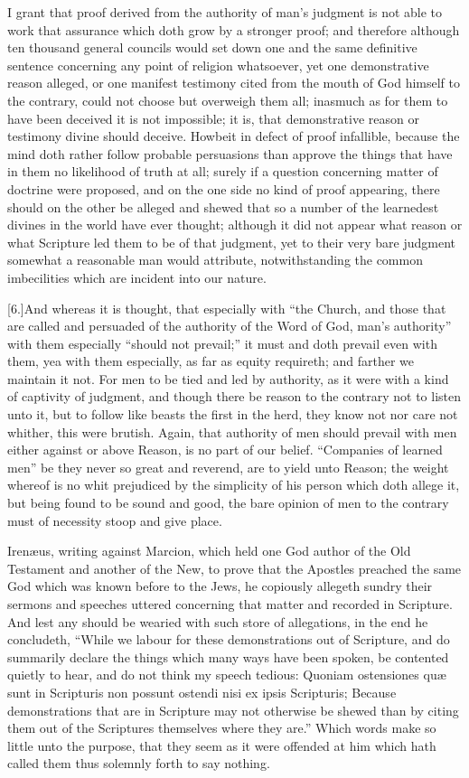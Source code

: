 I grant that proof derived from the authority of man’s judgment is not able to work that assurance which doth grow by a stronger proof; and therefore although ten thousand general councils would set down one and the same definitive sentence concerning any point of religion whatsoever, yet one demonstrative reason alleged, or one manifest testimony cited from the mouth of God himself to the contrary, could not  choose but overweigh them all; inasmuch as for them to have been deceived it is not impossible; it is, that demonstrative reason or testimony divine should deceive. Howbeit in defect of proof infallible, because the mind doth rather follow probable persuasions than approve the things that have in them no likelihood of truth at all; surely if a question concerning matter of doctrine were proposed, and on the one side no kind of proof appearing, there should on the other be alleged and shewed that so a number of the learnedest divines in the world have ever thought; although it did not appear what reason or what Scripture led them to be of that judgment, yet to their very bare judgment somewhat a reasonable man would attribute, notwithstanding the common imbecilities which are incident into our nature.

[6.]And whereas it is thought, that especially with “the Church, and those that are called and persuaded of the authority of the Word of God, man’s authority” with them especially “should not prevail;” it must and doth prevail even with them, yea with them especially, as far as equity requireth; and farther we maintain it not. For men to be  tied and led by authority, as it were with a kind of captivity of judgment, and though there be reason to the contrary not to listen unto it, but to follow like beasts the first in the herd, they know not nor care not whither, this were brutish. Again, that authority of men should prevail with men either against or above Reason, is no part of our belief. “Companies of learned men” be they never so great and reverend, are to yield unto Reason; the weight whereof is no whit prejudiced by the simplicity of his person which doth allege it, but being found to be sound and good, the bare opinion of men to the contrary must of necessity stoop and give place.

Irenæus, writing against Marcion, which held one God author of the Old Testament and another of the New, to prove that the Apostles preached the same God which was known before to the Jews, he copiously allegeth sundry their sermons and speeches uttered concerning that matter and recorded in Scripture. And lest any should be wearied with such store of allegations, in the end he concludeth, “While we labour for these demonstrations out of Scripture, and do summarily declare the things which many ways have been  spoken, be contented quietly to hear, and do not think my speech tedious: Quoniam ostensiones quæ sunt in Scripturis non possunt ostendi nisi ex ipsis Scripturis; Because demonstrations that are in Scripture may not otherwise be shewed than by citing them out of the Scriptures themselves where they are.” Which words make so little unto the purpose, that they seem as it were offended at him which hath called them thus solemnly forth to say nothing.

